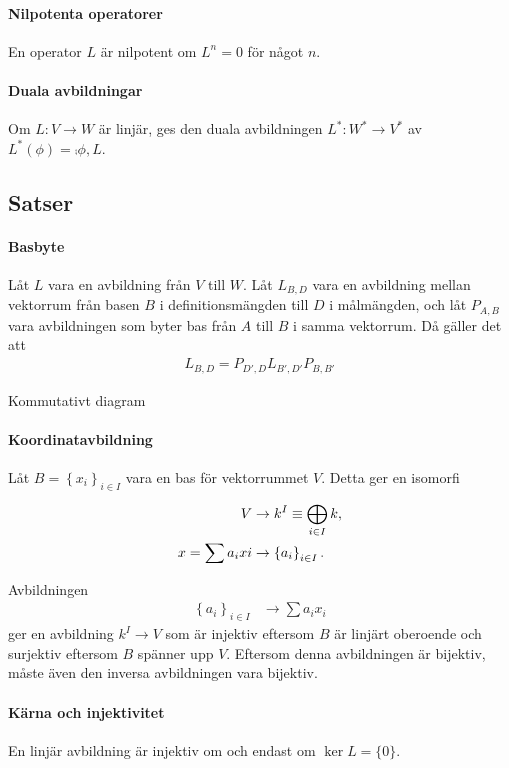 \paragraph{Nilpotenta operatorer}
En operator $L$ är nilpotent om $L^{n} = 0$ för något $n$.

\paragraph{Duala avbildningar}
Om $L: V\to W$ är linjär, ges den duala avbildningen $L^{*}: W^{*}\to V^{*}$ av $L^{*}(\phi) = \comp{{\phi, L}}$.

\subsection{Satser}

\paragraph{Basbyte}
Låt $L$ vara en avbildning från $V$ till $W$. Låt $L_{B, D}$ vara en avbildning mellan vektorrum från basen $B$ i definitionsmängden till $D$ i målmängden, och låt $P_{A, B}$ vara avbildningen som byter bas från $A$ till $B$ i samma vektorrum. Då gäller det att
\begin{align*}
	L_{B, D} = P_{D', D}L_{B', D'}P_{B, B'}
\end{align*}

\proof
Kommutativt diagram

\paragraph{Koordinatavbildning}
Låt $B = \left\{x_{i}\right\}_{i\in I}$ vara en bas för vektorrummet $V$. Detta ger en isomorfi
\begin{align*}
	V                  &\to k^{I}\equiv \bigoplus\limits_{i\in I}^{}k, \\
	x = \sum a_{i}x{i} &\to \left\{a_{i}\right\}_{i\in I}.
\end{align*}

\proof
Avbildningen
\begin{align*}
	\left\{a_{i}\right\}_{i\in I} &\to \sum a_{i}x_{i}
\end{align*}
ger en avbildning $k^{I}\to V$ som är injektiv eftersom $B$ är linjärt oberoende och surjektiv eftersom $B$ spänner upp $V$. Eftersom denna avbildningen är bijektiv, måste även den inversa avbildningen vara bijektiv.

\paragraph{Kärna och injektivitet}
En linjär avbildning är injektiv om och endast om $\ker{L} = \{0\}$.

